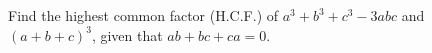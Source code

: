 Find the highest common factor (H.C.F.) of $a^3+b^3+c^3-3abc$ and $(a+b+c)^3$, given that $ab+bc+ca=0$.
